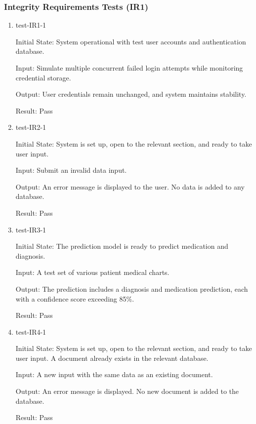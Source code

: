 \documentclass[12pt, titlepage]{article}
\begin{document}
\subsubsection{Integrity Requirements Tests (IR1)} \label{section:4.10.2}

\begin{enumerate}

  \item test-IR1-1 \label{test-IR1-1}

  Initial State: System operational with test user accounts and authentication database.

  Input: Simulate multiple concurrent failed login attempts while monitoring credential storage.


  Output: User credentials remain unchanged, and system maintains stability.

  Result: Pass

  \item test-IR2-1 \label{test-IR2-1}

  Initial State: System is set up, open to the relevant section, and ready to take user input.

  Input: Submit an invalid data input.

  Output: An error message is displayed to the user. No data is added to any database.

  Result: Pass

  \item test-IR3-1 \label{test-IR3-1}

  Initial State: The prediction model is ready to predict medication and diagnosis.

  Input: A test set of various patient medical charts.

  Output: The prediction includes a diagnosis and medication prediction, each with a confidence score exceeding 85\%.

  Result: Pass

  \item test-IR4-1 \label{test-IR4-1}

  Initial State: System is set up, open to the relevant section, and ready to take user input. A document already exists in the relevant database.

  Input: A new input with the same data as an existing document.

  Output: An error message is displayed. No new document is added to the database.

  Result: Pass


\end{enumerate}
\end{document}
